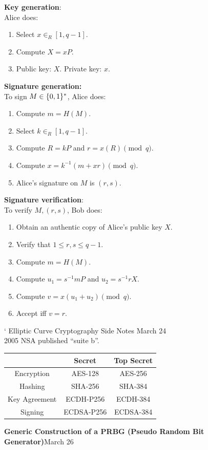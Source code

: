 \documentclass[a4paper,12pt]{article}
\begin{document}
{\bf Key generation}:
\\[1em]
Alice does:
\begin{enumerate}
\item
Select $x\in_R[1,q-1]$.
\item
Compute $X=xP$.
\item
Public key: $X$.  Private key: $x$.
\end{enumerate}
{\bf Signature generation:}
\\[1em]
To sign $M\in\{0,1\}^*$, Alice does:
\begin{enumerate}
\item
Compute $m=H(M)$.
\item
Select $k\in_R[1,q-1]$.
\item
Compute $R=kP$ and $r=x(R)\pmod q$.
\item
Compute $x=k^{-1}(m+xr)\pmod q$.
\item
Alice's signature on $M$ is $(r,s)$.
\end{enumerate}
{\bf Signature verification}:
\\[1em]
To verify $M,(r,s)$, Bob does:
\begin{enumerate}
\item
Obtain an authentic copy of Alice's public key $X$.
\item
Verify that $1\le r,s\le q-1$.
\item
Compute $m=H(M)$.
\item
Compute $u_1 = s^{-1}mP$ and $u_2 = s^{-1} r X$.
\item
Compute $v=x(u_1+u_2) \pmod q$.
\item
Accept iff $v=r$.
\end{enumerate}`\clearpage
Elliptic Curve Cryptography Side Notes \hfill March 24
\\[1em]
2005 NSA published ``{\sc suite b}''.
\\[1em]
\begin{center}
\begin{tabular}{ c | c c }
 & Secret & Top Secret \\
\hline
Encryption    & AES-128    & AES-256\\
Hashing       & SHA-256    & SHA-384\\
Key Agreement & ECDH-P256  & ECDH-384\\
Signing       & ECDSA-P256 & ECDSA-384
 \end{tabular}
 \end{center}
\clearpage
{\bf Generic Construction of a PRBG (Pseudo Random Bit Generator)}\hfill March 26
\\[1em]
\end{document}

